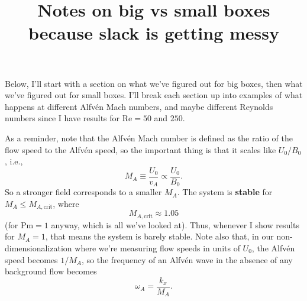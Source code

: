 \documentclass[%
 preprint,
 amsmath,amssymb,
 aps,
]{revtex4-2}
\begin{document}

\title{Notes on big vs small boxes because slack is getting messy}





\maketitle

Below, I'll start with a section on what we've figured out for big boxes, then what we've figured out for small boxes. I'll break each section up into examples of what happens at different Alfv\'{e}n Mach numbers, and maybe different Reynolds numbers since I have results for $\mathrm{Re}=50$ and $250$.

As a reminder, note that the Alfv\'{e}n Mach number is defined as the ratio of the flow speed to the Alfv\'{e}n speed, so the important thing is that it scales like $U_0/B_0$, i.e.,
\begin{equation}
    M_A \equiv \frac{U_0}{v_A} \propto \frac{U_0}{B_0}.
\end{equation}
So a stronger field corresponds to a smaller $M_A$. The system is \textbf{stable} for $M_A \leq M_{A, \mathrm{crit}}$, where
\begin{equation}
M_{A, \mathrm{crit}} \approx 1.05
\end{equation}
(for $\mathrm{Pm} = 1$ anyway, which is all we've looked at). 
Thus, whenever I show results for $M_A = 1$, that means the system is barely stable. 
Note also that, in our non-dimensionalization where we're measuring flow speeds in units of $U_0$, the Alfv\'{e}n speed becomes $1/M_A$, so the frequency of an Alfv\'{e}n wave in the absence of any background flow becomes
\begin{equation}
    \omega_A = \frac{k_x}{M_A}.
\end{equation}
\end{document}
